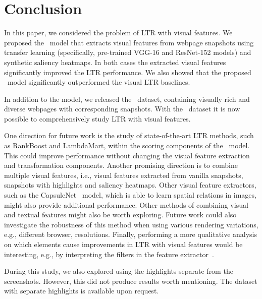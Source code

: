 
\section{Conclusion}
In this paper, we considered the problem of \ac{LTR} with visual features.
We proposed the \modelname~model that extracts visual features from webpage snapshots
using transfer learning (specifically, pre-trained VGG-16 and ResNet-152 models) and synthetic saliency heatmaps.
In both cases the extracted visual features significantly improved the \ac{LTR} performance.
We also showed that the proposed \modelname~model significantly outperformed the visual \ac{LTR} baselines.

In addition to the model, we released the \datasetname~dataset, containing visually rich and diverse webpages with corresponding snapshots.
With the \datasetname~dataset it is now possible to comprehensively study \ac{LTR} with visual features.

One direction for future work is the study of state-of-the-art \ac{LTR} methods, such as RankBoost and LambdaMart, within the scoring components of the \modelname~model.
This could improve performance without changing the visual feature extraction and transformation components.
Another promising direction is to combine multiple visual features,
i.e., visual features extracted from vanilla snapshots, snapshots with highlights and saliency heatmaps. Other visual feature extractors, such as the CapsuleNet~\cite{sabour2017dynamic} model, which is able to learn spatial relations in images, might also provide additional performance. 
Other methods of combining visual and textual features might also be worth exploring. 
Future work could also investigate the robustness of this method when using various rendering variations, e.g., different browser, resolutions. 
Finally, performing a more qualitative analysis on which elements cause improvements in \ac{LTR} with visual features would be interesting, e.g., by interpreting the filters in the feature extractor~\cite{olah2018the}. 

During this study, we also explored using the highlights separate from the screenshots. 
However, this did not produce results worth mentioning. 
The dataset with separate highlights is available upon request. 
\fi